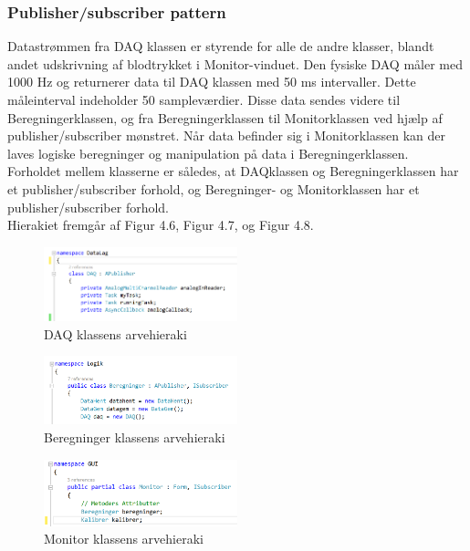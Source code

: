 \subsubsection{Publisher/subscriber pattern}
Datastrømmen fra DAQ klassen er styrende for alle de andre klasser, blandt andet udskrivning af blodtrykket i Monitor-vinduet. Den fysiske DAQ måler med 1000 Hz og returnerer data til DAQ klassen med 50 ms intervaller. Dette måleinterval indeholder 50 sampleværdier. Disse data sendes videre til Beregningerklassen, og fra Beregningerklassen til Monitorklassen ved hjælp af publisher/subscriber mønstret. Når data befinder sig i Monitorklassen kan der laves logiske beregninger og manipulation på data i Beregningerklassen.\\
Forholdet mellem klasserne er således, at DAQklassen og Beregningerklassen har et publisher/subscriber forhold, og  Beregninger- og Monitorklassen har et publisher/subscriber forhold. \\
Hierakiet fremgår af Figur 4.6, Figur 4.7, og Figur 4.8.
\begin{figure}[H]
	\centering
	\includegraphics[width=0.5\textwidth]{Figurer/DAQ_pub}
	\caption{DAQ klassens arvehieraki}
\end{figure}

\begin{figure}[H]
	\centering
	\includegraphics[width=0.5\textwidth]{Figurer/Beregninger_subpub}
	\caption{Beregninger klassens arvehieraki}
\end{figure}

\begin{figure}[H]
	\centering
	\includegraphics[width=0.5\textwidth]{Figurer/Monitor_sub}
	\caption{Monitor klassens arvehieraki}
\end{figure}


